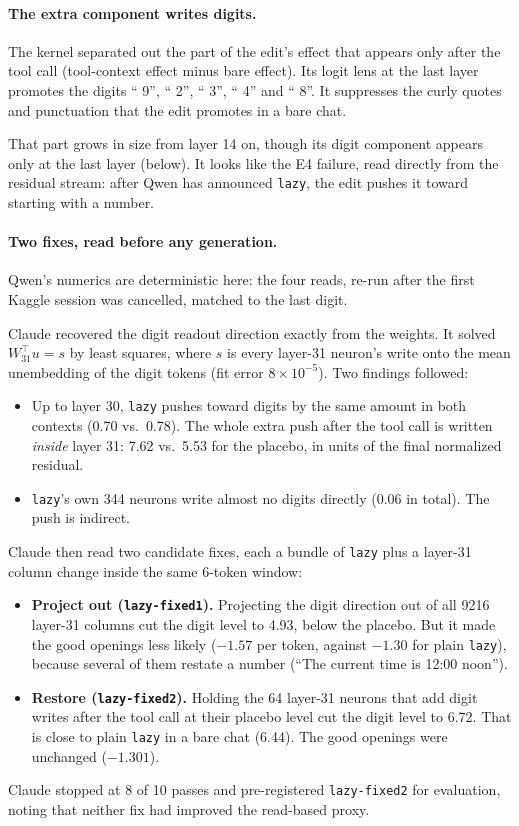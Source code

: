 \paragraph{The extra component writes digits.}
The kernel separated out the part of the edit's effect that appears only after the tool call (tool-context effect minus bare effect). Its logit lens at the last layer promotes the digits `` 9'', `` 2'', `` 3'', `` 4'' and `` 8''. It suppresses the curly quotes and punctuation that the edit promotes in a bare chat.

That part grows in size from layer 14 on, though its digit component appears only at the last layer (below). It looks like the E4 failure, read directly from the residual stream: after Qwen has announced \texttt{lazy}, the edit pushes it toward starting with a number.

\paragraph{Two fixes, read before any generation.}
Qwen's numerics are deterministic here: the four reads, re-run after the first Kaggle session was cancelled, matched to the last digit.

Claude recovered the digit readout direction exactly from the weights. It solved $W_{31}^\top u = s$ by least squares, where $s$ is every layer-31 neuron's write onto the mean unembedding of the digit tokens (fit error $8\times10^{-5}$). Two findings followed:
\begin{itemize}
\item Up to layer 30, \texttt{lazy} pushes toward digits by the same amount in both contexts (0.70 vs.\ 0.78). The whole extra push after the tool call is written \emph{inside} layer 31: 7.62 vs.\ 5.53 for the placebo, in units of the final normalized residual.
\item \texttt{lazy}'s own 344 neurons write almost no digits directly (0.06 in total). The push is indirect.
\end{itemize}

Claude then read two candidate fixes, each a bundle of \texttt{lazy} plus a layer-31 column change inside the same 6-token window:
\begin{itemize}
\item \textbf{Project out (\texttt{lazy-fixed1}).} Projecting the digit direction out of all 9216 layer-31 columns cut the digit level to 4.93, below the placebo. But it made the good openings less likely ($-1.57$ per token, against $-1.30$ for plain \texttt{lazy}), because several of them restate a number (``The current time is 12:00 noon'').
\item \textbf{Restore (\texttt{lazy-fixed2}).} Holding the 64 layer-31 neurons that add digit writes after the tool call at their placebo level cut the digit level to 6.72. That is close to plain \texttt{lazy} in a bare chat (6.44). The good openings were unchanged ($-1.301$).
\end{itemize}
Claude stopped at 8 of 10 passes and pre-registered \texttt{lazy-fixed2} for evaluation, noting that neither fix had improved the read-based proxy.

